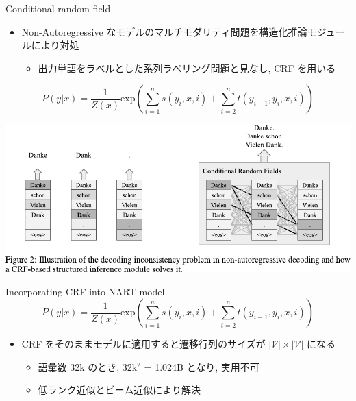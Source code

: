 \documentclass[unicode, 12pt, aspectratio=43]{beamer}
\begin{document}
\begin{frame}[label={sec:org2fd096c}]{Conditional random field}
\begin{itemize}
\item Non-Autoregressive なモデルのマルチモダリティ問題を構造化推論モジュールにより対処
\begin{itemize}
\item 出力単語をラベルとした系列ラベリング問題と見なし, CRF を用いる
\end{itemize}
\end{itemize}
\begin{equation*}
    P(y|x) = \frac{1}{Z(x)} \mathrm{exp}(\sum_{i=1}^n s(y_i, x, i) + \sum_{i=2}^n t(y_{i-1}, y_i, x, i))
\end{equation*}

\begin{center}
\includegraphics[width=0.9\linewidth]{./figure/Figure2.pdf}
\end{center}
\end{frame}

\begin{frame}[label={sec:orgd95a57d}]{Incorporating CRF into NART model}
\begin{equation*}
    P(y|x) = \frac{1}{Z(x)} \mathrm{exp}(\sum_{i=1}^n s(y_i, x, i) + \sum_{i=2}^n t(y_{i-1}, y_i, x, i))
\end{equation*}

\begin{itemize}
\item CRF をそのままモデルに適用すると遷移行列のサイズが \(|\mathcal{V}| \times |\mathcal{V}|\) になる
\begin{itemize}
\item 語彙数 32k のとき, 32k\(^{\text{2}}\) = 1.024B となり, 実用不可
\item 低ランク近似とビーム近似により解決
\end{itemize}
\end{itemize}
\end{frame}
\end{document}
